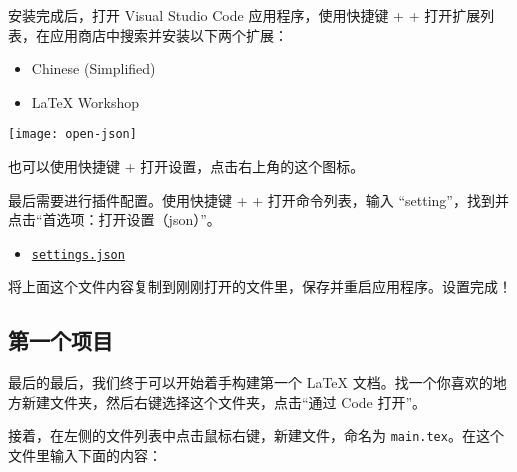 安装完成后，打开 Visual Studio Code 应用程序，使用快捷键  +  +  打开扩展列表，在应用商店中搜索并安装以下两个扩展：
\begin{itemize}
  \item Chinese (Simplified)
  \item LaTeX Workshop
\end{itemize}

\begin{marginfigure}
  \centering
  \texttt{[image: open-json]}
  \caption{也可以使用快捷键  + \kbd{,} 打开设置，点击右上角的这个图标。}
\end{marginfigure}

最后需要进行插件配置。使用快捷键  +  +  打开命令列表，输入 “setting”，找到并点击“首选项：打开设置（json）”。

\begin{itemize}
  \item \href{https://git.nju.edu.cn/atXYblip/install-latex-instantly/-/raw/main/.vscode/settings.json}{\faFile*[regular] \texttt{settings.json}}
\end{itemize}

将上面这个文件内容复制到刚刚打开的文件里，保存并重启应用程序。设置完成！

\subsection{第一个项目}

\begin{widepar}
最后的最后，我们终于可以开始着手构建第一个 \LaTeX{} 文档。找一个你喜欢的地方新建文件夹，然后右键选择这个文件夹，点击“通过 Code 打开”。

接着，在左侧的文件列表中点击鼠标右键，新建文件，命名为 \texttt{main.tex}。在这个文件里输入下面的内容：
\end{widepar}


